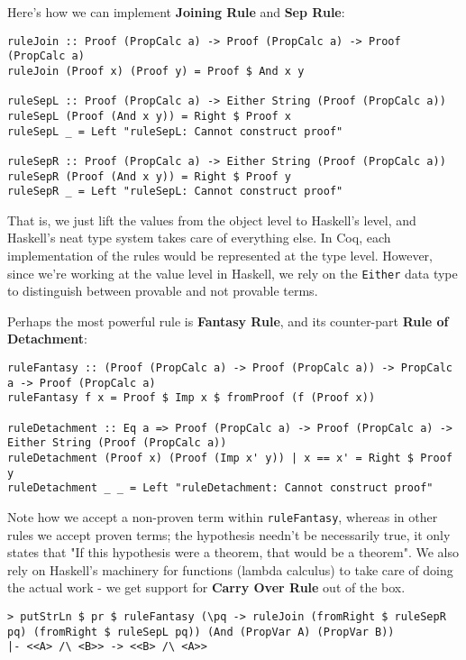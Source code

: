 \documentclass{article}
\begin{document}
Here's how we can implement \textbf{Joining Rule} and \textbf{Sep Rule}:

\begin{lstlisting}
ruleJoin :: Proof (PropCalc a) -> Proof (PropCalc a) -> Proof (PropCalc a)
ruleJoin (Proof x) (Proof y) = Proof $ And x y

ruleSepL :: Proof (PropCalc a) -> Either String (Proof (PropCalc a))
ruleSepL (Proof (And x y)) = Right $ Proof x
ruleSepL _ = Left "ruleSepL: Cannot construct proof"

ruleSepR :: Proof (PropCalc a) -> Either String (Proof (PropCalc a))
ruleSepR (Proof (And x y)) = Right $ Proof y
ruleSepR _ = Left "ruleSepL: Cannot construct proof"
\end{lstlisting}

That is, we just lift the values from the object level to Haskell's level, and Haskell's neat type system takes care of everything else. In Coq, each implementation of the rules would be represented at the type level. However, since we're working at the value level in Haskell, we rely on the \texttt{Either} data type to distinguish between provable and not provable terms. 

Perhaps the most powerful rule is \textbf{Fantasy Rule}, and its counter-part \textbf{Rule of Detachment}:

\begin{lstlisting}
ruleFantasy :: (Proof (PropCalc a) -> Proof (PropCalc a)) -> PropCalc a -> Proof (PropCalc a)
ruleFantasy f x = Proof $ Imp x $ fromProof (f (Proof x))

ruleDetachment :: Eq a => Proof (PropCalc a) -> Proof (PropCalc a) -> Either String (Proof (PropCalc a))
ruleDetachment (Proof x) (Proof (Imp x' y)) | x == x' = Right $ Proof y
ruleDetachment _ _ = Left "ruleDetachment: Cannot construct proof"
\end{lstlisting}

Note how we accept a non-proven term within \texttt{ruleFantasy}, whereas in other rules we accept proven terms; the hypothesis needn't be necessarily true, it only states that "If this hypothesis were a theorem, that would be a theorem". We also rely on Haskell's machinery for functions (lambda calculus) to take care of doing the actual work - we get support for \textbf{Carry Over Rule} out of the box.

\begin{lstlisting}
> putStrLn $ pr $ ruleFantasy (\pq -> ruleJoin (fromRight $ ruleSepR pq) (fromRight $ ruleSepL pq)) (And (PropVar A) (PropVar B))
|- <<A> /\ <B>> -> <<B> /\ <A>>
\end{lstlisting}
\end{document}

